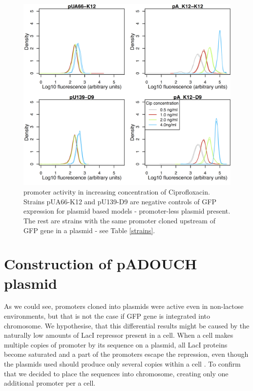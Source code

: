 \begin{figure}[ht!]
  \centering
  \includegraphics[scale=0.25]{text/Pictures/recAassay.png}
	\caption{ promoter activity in increasing concentration of Ciprofloxacin. Strains pUA66-K12 and pU139-D9 are negative controls of GFP expression for plasmid based models - promoter-less plasmid present. The rest are strains with the same  promoter cloned upstream of GFP gene in a plasmid - see Table \ref{strains}.}
	\label{lacZassay}
\end{figure}



\section{Construction of pADOUCH plasmid}
As we could see,  promoters cloned into plasmids were active even in non-lactose environments, but that is not the case if GFP gene is integrated into chromosome.
We hypothesise, that this differential results might be caused by the naturally low amounts of LacI repressor present in a cell.
When a cell makes multiple copies of  promoter by its sequence on a plasmid, all LacI proteins become saturated and a part of the promoters escape the repression, even though the plasmids used should produce only several copies within a cell \cite{zaslaver2006comprehensive}.
To confirm that we decided to place the  sequences into chromosome, creating only one additional  promoter per a cell.

